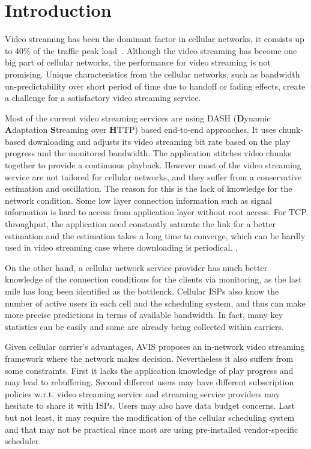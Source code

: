 \section{Introduction}
Video streaming has been the dominant factor in cellular networks, it consists
up to 40\% of the traffic peak load~\cite{LTENetwork, VideoMeasureatt}. Although
the video streaming has become one big part of cellular networks, the
performance for video streaming is not promising. Unique characteristics from
the cellular networks, such as bandwidth un-predictability over short period of
time due to handoff or fading effects, create a challenge for a satisfactory
video streaming service. 

Most of the current video streaming services are using DASH (\textbf{D}ynamic
\textbf{A}daptation \textbf{S}treaming over \textbf{H}TTP)\cite{DASH} based
end-to-end approaches. It uses chunk-based downloading and adjusts its video
streaming bit rate based on the play progress and the monitored bandwidth. The
application stitches video chunks together to provide a continuous playback.
However most of the video streaming service are not tailored for cellular networks, and they suffer from a conservative estimation and oscillation.\cite{BBA,Festive, QDASH} The reason for this is the lack of knowledge for the network condition. 
Some low layer connection information such as signal information is hard to access from application layer without root access.
For TCP throughput, the application need constantly saturate the link for a better estimation
and the estimation takes a long time to converge, which can be hardly used in video streaming case where downloading is periodical.\cite{OnOff,Sprout}  , 

On the other hand, a cellular network service provider has much better knowledge of the connection
conditions for the clients via monitoring, as the last mile has long been identified as the
bottlenck.\cite{LASTMILE} Cellular ISPs also know the number of
active users in each cell and the scheduling system, and thus can make more
precise predictions in terms of available bandwidth. In fact, many key statistics can be easily and some are
already being collected within carriers. 

Given cellular carrier's advantages, AVIS\cite{Avis} proposes an in-network video streaming framework where the network makes decision. 
Nevertheless it also suffers from some constraints. First it
lacks the application knowledge of play progress and may lead to rebuffering. 
Second different users may have different subscription
policies w.r.t. video streaming service and streaming service providers may
hesitate to share it with ISPs. Users may also have data budget concerns. Last
but not least, it may require the modification of the cellular scheduling system and that
may not be practical since most are using pre-installed
vendor-specific scheduler. 

